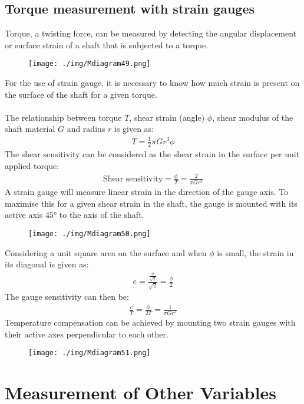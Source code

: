 \subsection{Torque measurement with strain gauges}
Torque, a twisting force, can be measured by detecting the angular displacement or surface strain of a shaft that is subjected to a torque.
\begin{figure}[H]
  \centering
  \texttt{[image: ./img/Mdiagram49.png]}
\end{figure}
For the use of strain gauge, it is necessary to know how much strain is present on the surface of the shaft for a given torque. \\\\
The relationship between torque $T$, shear strain (angle) $\phi$, shear modulus of the shaft material $G$ and radius $r$ is given as:
\begin{gather}
  T = \frac{1}{2}\pi Gr^3\phi
\end{gather}
The shear sensitivity can be considered as the shear strain in the surface per unit applied torque:
\begin{gather}
  \text{Shear sensitivity} = \frac{\phi}{T} = \frac{2}{\pi Gr^3}
\end{gather}
A strain gauge will measure linear strain in the direction of the gauge axis. To maximise this for a given shear strain in the shaft, the gauge is mounted with its active axis $\ang{45}$ to the axis of the shaft.
\begin{figure}[H]
  \centering
  \texttt{[image: ./img/Mdiagram50.png]}
\end{figure}
Considering a unit square area on the surface and when $\phi$ is small, the strain in its diagonal is given as:
\begin{gather}
  e = \frac{\frac{\phi}{\sqrt{2}}}{\sqrt{2}} = \frac{\phi}{2}
\end{gather}
The gauge sensitivity can then be:
\begin{gather}
  \frac{e}{T} = \frac{\phi}{2T} = \frac{1}{\pi Gr^3}
\end{gather}
Temperature compensation can be achieved by mounting two strain gauges with their active axes perpendicular to each other.
\begin{figure}[H]
  \centering
  \texttt{[image: ./img/Mdiagram51.png]}
\end{figure}
\section{Measurement of Other Variables}

